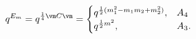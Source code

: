 \begin{equation}
q^{E_m}=q^{{1\over 4}\vm C\vm}=
\begin{cases}
q^{{1\over 2}(m_1^2-m_1m_2+m_2^2)},&A_4\\
q^{{1\over 2} m^2},&A_3.
\end{cases}
\end{equation}

